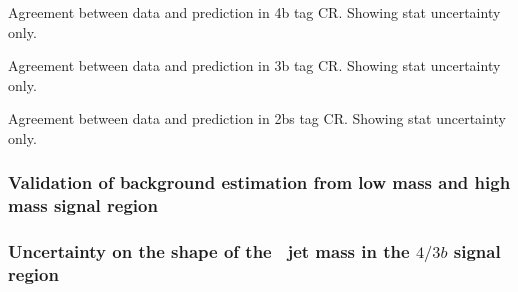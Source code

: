 \begin{table}[htbp!]
\begin{center}

\end{center}
\caption{Agreement between data and prediction in 4b tag CR. Showing stat uncertainty only.}
\label{CRSB:Tab_4b_CR_Variations}
\end{table}

\begin{table}[htbp!]
\begin{center}

\end{center}
\caption{Agreement between data and prediction in 3b tag CR. Showing stat uncertainty only.}
\label{CRSB:Tab_3b_CR_Variations}
\end{table}
\begin{table}[htbp!]
\begin{center}

\end{center}
\caption{Agreement between data and prediction in 2bs tag CR. Showing stat uncertainty only.}
\label{CRSB:Tab_2bs_CR_Variations}
\end{table}





%

\clearpage
\subsubsection{Validation of background estimation from low mass and high mass signal region}
\label{sec:boosted-ZZ-Rehearsal}



\clearpage
\subsubsection{Uncertainty on the shape of the \ttbar\ jet mass in the $4/3b$ signal region}
\label{sec:unc-shape-ttbar-in-sr}

